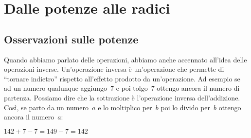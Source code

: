 














\section{Dalle potenze alle radici}
\label{sec:radicali_potenze_radici}

\subsection{Osservazioni sulle potenze}


Quando abbiamo parlato delle operazioni, abbiamo anche accennato all'idea
delle operazioni inverse. Un'operazione inversa è un'operazione che permette
di ``tornare indietro'' rispetto all'effetto prodotto da un'operazione.
Ad esempio se ad un numero qualunque aggiungo~7 e poi tolgo~7 ottengo ancora 
il 
numero di partenza. Possiamo dire che la sottrazione è l'operazione inversa 
dell'addizione. Così, se parto da un numero~\(a\) e lo moltiplico per~\(b\) 
poi lo 
divido per~\(b\) ottengo ancora il numero~\(a\):

\(142 + 7 - 7 = 149 -7 = 142\)

